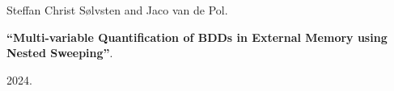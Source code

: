 Steffan Christ Sølvsten and Jaco van de Pol.

{\bf ``Multi-variable Quantification of BDDs in External Memory using Nested Sweeping''}.

2024.

\medskip

